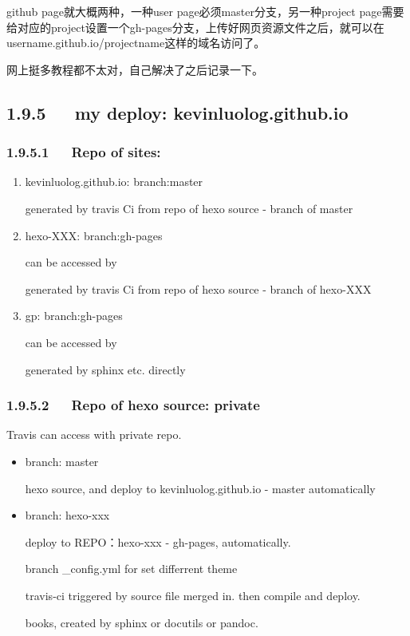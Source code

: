 \documentclass[letterpaper,12pt,english]{sphinxmanual}
\begin{document}
github page就大概两种，一种user page必须master分支，另一种project page需要给对应的project设置一个gh-pages分支，上传好网页资源文件之后，就可以在username.github.io/projectname这样的域名访问了。

网上挺多教程都不太对，自己解决了之后记录一下。


\subsection{1.9.5   my deploy: kevinluolog.github.io}
\label{\detokenize{001software/001install/001._u7f51_u7ad9/hexo:my-deploy-kevinluolog-github-io}}

\subsubsection{1.9.5.1   Repo of sites:}
\label{\detokenize{001software/001install/001._u7f51_u7ad9/hexo:repo-of-sites}}\begin{enumerate}
%
\item {} 
kevinluolog.github.io: branch:master

generated by travis Ci from repo of hexo source - branch of master

\item {} 
hexo-XXX: branch:gh-pages

can be accessed by 

generated by travis Ci from repo of hexo source - branch of hexo-XXX

\item {} 
gp: branch:gh-pages

can be accessed by 

generated by sphinx etc. directly

\end{enumerate}


\subsubsection{1.9.5.2   Repo of hexo source: private}
\label{\detokenize{001software/001install/001._u7f51_u7ad9/hexo:repo-of-hexo-source-private}}
Travis can access with private repo.
\begin{itemize}
\item {} 
branch: master

hexo source, and deploy to kevinluolog.github.io - master automatically

\item {} 
branch: hexo-xxx

deploy to REPO：hexo-xxx - gh-pages, automatically.

branch \_config.yml for set differrent theme

travis-ci triggered by source file merged in. then compile and deploy.

books, created by sphinx or docutils or pandoc.

\end{itemize}
\end{document}
